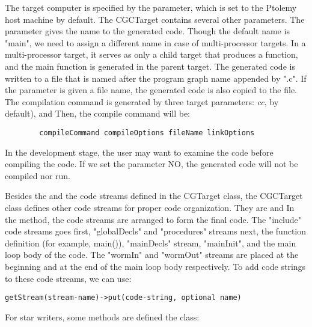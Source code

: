 The target computer is specified
by the
parameter, which is set to the Ptolemy host machine by default.
The CGCTarget contains several other parameters.
The
parameter gives the name to the generated code. Though the default name is
"main", we need to assign a different name in case of multi-processor
targets. In a multi-processor target, it serves as only a child target that
produces a function, and the main function is generated in the parent
target. The generated code is written to a file that is named after the
program graph name appended by ".c". If the
parameter is given a file name, the generated code is also copied to
the file.
The compilation command is generated by three target parameters:
\emph{cc}, by default), 
and 
Then, the compile command will be:

\begin{verbatim}
        compileCommand compileOptions fileName linkOptions
\end{verbatim}

In the development stage, the user may want to examine the code before
compiling the code. If we set the parameter
NO, the generated code will not be compiled nor run.

Besides the
and the
code streams defined in the CGTarget class, the CGCTarget class
defines other code streams for proper code organization.
They are 
and
In the 
method, the code streams are arranged to form the final code.
The "include" code streams goes first, "globalDecls" and
"procedures" streams next,
the function definition (for example, main()), "mainDecls" stream,
"mainInit", and the main loop body of the code. The "wormIn" and
"wormOut" streams are placed at the beginning and at the end of
the main loop body respectively.
To add code strings to these code streams, we can use:

\begin{verbatim}
getStream(stream-name)->put(code-string, optional name)
\end{verbatim}

For star writers, some methods are defined the 
class:

